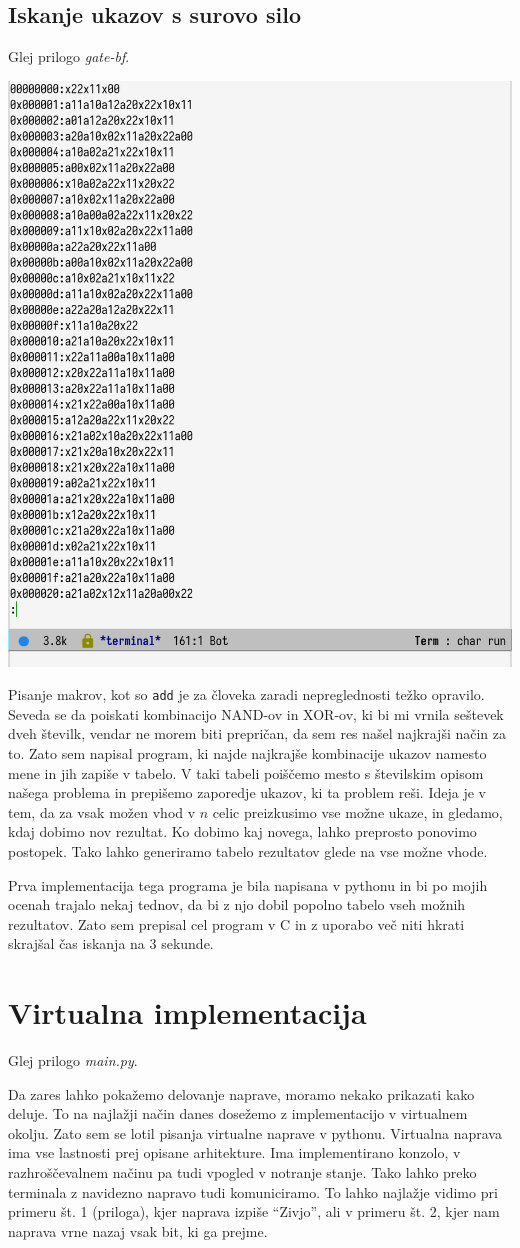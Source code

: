 \documentclass[12pt]{article}
\begin{document}
\subsection{Iskanje ukazov s surovo silo}
Glej prilogo \textit{gate-bf}.

\begin{center}
  \includegraphics[width=.3\linewidth]{slike/predstavitev/gate-bf.png}
\end{center}

Pisanje makrov, kot so \texttt{add} je za človeka zaradi nepreglednosti težko opravilo.
Seveda se da poiskati kombinacijo NAND-ov in XOR-ov, ki bi mi vrnila seštevek dveh številk, vendar ne morem biti prepričan, da sem res našel najkrajši način za to.
Zato sem napisal program, ki najde najkrajše kombinacije ukazov namesto mene in jih zapiše v tabelo.
V taki tabeli poiščemo mesto s številskim opisom našega problema in prepišemo zaporedje ukazov, ki ta problem reši.
Ideja je v tem, da za vsak možen vhod v $n$ celic preizkusimo vse možne ukaze, in gledamo, kdaj dobimo nov rezultat.
Ko dobimo kaj novega, lahko preprosto ponovimo postopek.
Tako lahko generiramo tabelo rezultatov glede na vse možne vhode.

Prva implementacija tega programa je bila napisana v pythonu in bi po mojih ocenah trajalo nekaj tednov, da bi z njo dobil popolno tabelo vseh možnih rezultatov.
Zato sem prepisal cel program v C in z uporabo več niti hkrati skrajšal čas iskanja na 3 sekunde.

\section{Virtualna implementacija}
Glej prilogo \textit{main.py}.

Da zares lahko pokažemo delovanje naprave, moramo nekako prikazati kako deluje.
To na najlažji način danes dosežemo z implementacijo v virtualnem okolju.
Zato sem se lotil pisanja virtualne naprave v pythonu.
Virtualna naprava ima vse lastnosti prej opisane arhitekture.
Ima implementirano konzolo, v razhroščevalnem načinu pa tudi vpogled v notranje stanje.
Tako lahko preko terminala z navidezno napravo tudi komuniciramo.
To lahko najlažje vidimo pri primeru št. 1 (priloga), kjer naprava izpiše ``Zivjo'', ali v primeru št. 2, kjer nam naprava vrne nazaj vsak bit, ki ga prejme.
\end{document}

